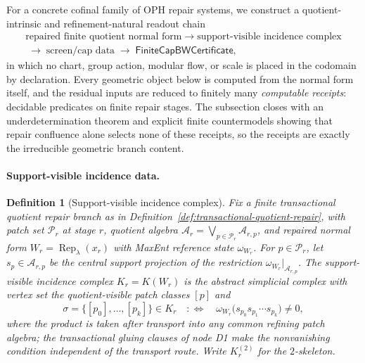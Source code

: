 \documentclass[11pt]{article}
\newtheorem{definition}[theorem]{Definition}
\begin{document}
For a concrete cofinal family of OPH repair systems, we construct a quotient-intrinsic and
refinement-natural readout chain
\[
\begin{gathered}
\text{repaired finite quotient normal form}
\;\longrightarrow\;
\text{support-visible incidence complex}\\
\;\longrightarrow\;
\text{screen/cap data}
\;\longrightarrow\;
\mathsf{FiniteCapBWCertificate},
\end{gathered}
\]
in which no chart, group action, modular flow, or scale is placed in the
codomain by declaration. Every geometric object below is computed from the
normal form itself, and the residual inputs are reduced to finitely many
\emph{computable receipts}: decidable predicates on finite repair stages. The
subsection closes with an underdetermination theorem and explicit finite
countermodels showing that repair confluence alone selects none of these
receipts, so the receipts are exactly the irreducible geometric branch content.

\paragraph{Support-visible incidence data.}

\begin{definition}[Support-visible incidence complex]
\label{def:support-visible-incidence-complex}
Fix a finite transactional quotient repair branch as in
Definition~\ref{def:transactional-quotient-repair}, with patch set
\(\mathcal P_r\) at stage \(r\), quotient algebra
\(\mathcal A_r=\bigvee_{p\in\mathcal P_r}\mathcal A_{r,p}\), and repaired
normal form \(W_r=\operatorname{Rep}_\lambda(x_r)\) with MaxEnt reference state
\(\omega_{W_r}\). For \(p\in\mathcal P_r\), let \(s_p\in\mathcal A_{r,p}\) be
the central support projection of the restriction
\(\omega_{W_r}|_{\mathcal A_{r,p}}\). The \emph{support-visible incidence
complex} \(K_r=K(W_r)\) is the abstract simplicial complex with vertex set the
quotient-visible patch classes \([p]\) and
\[
\sigma=\{[p_0],\ldots,[p_k]\}\in K_r
\quad:\Longleftrightarrow\quad
\omega_{W_r}\bigl(s_{p_0}s_{p_1}\cdots s_{p_k}\bigr)\neq0 ,
\]
where the product is taken after transport into any common refining patch
algebra; the transactional gluing clauses of node D1 make the nonvanishing
condition independent of the transport route. Write \(K^{(2)}_r\) for the
\(2\)-skeleton.
\end{definition}
\end{document}
